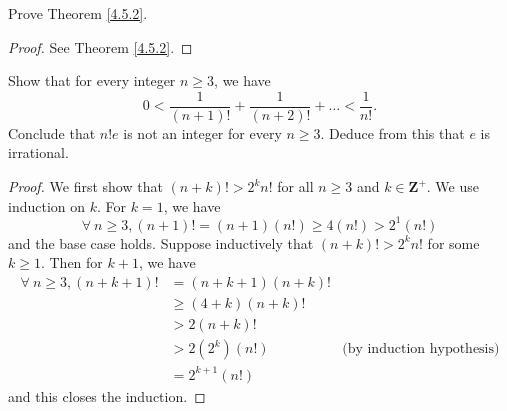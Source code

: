 \exercisesection

\begin{exercise}\label{ex 4.5.1}
    Prove Theorem \ref{4.5.2}.
\end{exercise}

\begin{proof}
    See Theorem \ref{4.5.2}.
\end{proof}

\begin{exercise}\label{ex 4.5.2}
    Show that for every integer \(n \geq 3\), we have
    \[
        0 < \frac{1}{(n + 1)!} + \frac{1}{(n + 2)!} + \dots < \frac{1}{n!}.
    \]
    Conclude that \(n! e\) is not an integer for every \(n \geq 3\).
    Deduce from this that \(e\) is irrational.
\end{exercise}

\begin{proof}
    We first show that \((n + k)! > 2^k n!\) for all \(n \geq 3\) and \(k \in \mathbf{Z}^+\).
    We use induction on \(k\).
    For \(k = 1\), we have
    \[
        \forall\ n \geq 3, (n + 1)! = (n + 1) (n!) \geq 4 (n!) > 2^1 (n!)
    \]
    and the base case holds.
    Suppose inductively that \((n + k)! > 2^k n!\) for some \(k \geq 1\).
    Then for \(k + 1\), we have
    \begin{align*}
        \forall\ n \geq 3, (n + k + 1)! & = (n + k + 1) (n + k)!                                    \\
                                        & \geq (4 + k)(n + k)!                                      \\
                                        & > 2 (n + k)!                                              \\
                                        & > 2 (2^k) (n!)         & \text{(by induction hypothesis)} \\
                                        & = 2^{k + 1} (n!)
    \end{align*}
    and this closes the induction.


\end{proof}
